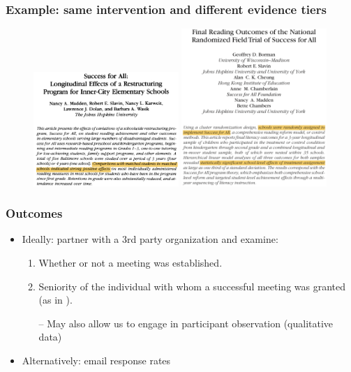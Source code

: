 \documentclass[usenames,dvipsnames]{beamer}
\begin{document}
\begin{frame}
\frametitle{Example: same intervention and different evidence tiers}

\begin{figure}
   \includegraphics[width=0.49\textwidth]{../figs/successforall_obs}
   \hfill
   \includegraphics[width=0.49\textwidth]{../figs/successforall_rct}
\end{figure}

\end{frame}



\begin{frame}
\frametitle{Outcomes}

\begin{itemize}
\item Ideally: partner with a \textcolor{Cerulean}{3rd party organization} and examine: 
\begin{enumerate} 
\item Whether or not a \textcolor{Cerulean}{meeting was established}. 
\item Seniority of the individual with whom a successful meeting was granted (as in \citet{kalla2016campaign}).
\pause
\item [--] May also allow us to engage in participant observation (qualitative data)
\end{enumerate}
\pause
\vspace{1cm}
\item Alternatively: \textcolor{Cerulean}{email response rates}
\end{itemize}

\end{frame}
\end{document}
